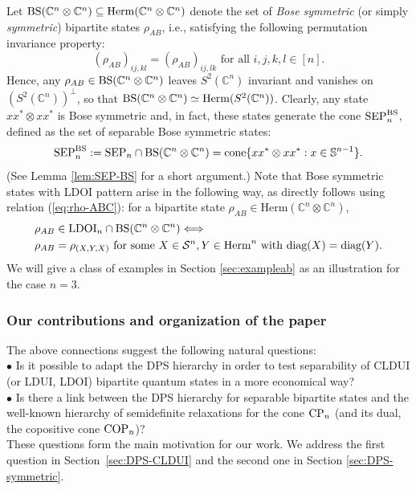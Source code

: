 \documentclass[11pt]{article}
\newcommand{\R}{\ensuremath{\mathbb{R}}}   %
\newcommand{\C}{\ensuremath{\mathbb{C}}} %
\newcommand{\MS}{{\mathcal S}}
\newcommand{\Herm}{\mathrm{Herm}}
\newcommand{\Cnn}{\C^n\ot \C^n}
\newcommand{\sS}{\mathbb S}
\newcommand{\SEP}{\text{\rm SEP}}
\newcommand{\CP}{\text{\rm CP}}
\newcommand{\COP}{\text{\rm COP}}
\newcommand{\LDUI}{\text{\rm LDUI}}
\newcommand{\LDOI}{\text{\rm LDOI}}
\newcommand{\SEPBS}{\SEP^{\BS}}
\newcommand{\cone}{\text{\rm cone}}
\newcommand{\diag}{\text{\rm diag}}
\newcommand{\ot}{\otimes}
\newcommand{\BS}{\text{\rm BS}}
\theoremstyle{plain}
\begin{document}
 Let $\BS(\Cnn)\subseteq\Herm(\Cnn)$ denote the set of {\em Bose symmetric} (or simply {\em symmetric}) bipartite  states $\rho_{AB}$, i.e., satisfying the following permutation invariance property: 
 $$(\rho_{AB})_{ij,kl}=(\rho_{AB})_{ij,lk} \text{  for all } i,j,k,l\in [n].$$
Hence, any $\rho_{AB}\in\BS(\C^n\ot \C^n)$ leaves $S^2(\C^n)$ invariant and vanishes on $(S^2(\C^n))^\perp$, so that $\BS(\C^n\ot \C^n)\simeq\Herm(S^2(\C^n))$. Clearly, any state $xx^*\ot xx^*$ is Bose symmetric and, in fact,  these states  generate  the cone  $\SEPBS_n$, defined as the  set of separable Bose symmetric states:
\begin{align}\label{eq:SEP-BS}
\SEPBS_n:=\SEP_n\cap\BS(\Cnn)=\cone\{xx^*\ot xx^*: x\in \sS^{n-1}\}.
\end{align}
(See Lemma \ref{lem:SEP-BS} for a short argument.)
Note that Bose symmetric states with LDOI pattern arise in the following way, as directly follows using relation (\ref{eq:rho-ABC}): for a 
bipartite state $\rho_{AB}\in\Herm(\C^n\ot \C^n)$,
\begin{align}\label{eq:LDUI-BS}
\begin{split}
&\rho_{AB}\in \LDOI_n \cap \BS(\C^n\ot \C^n)\Longleftrightarrow  \\
&\rho_{AB}=\rho_{(X,Y,X)} \text{ for some } X\in\MS^n, Y\in\Herm^n \text{ with } \diag(X)=\diag(Y).
\end{split}\end{align}
 We will give a class of examples in Section \ref{sec:exampleab} as  an illustration for the case $n=3$.

\subsubsection*{Our contributions and organization of the paper}
 The above connections suggest the following natural questions:\\ %
$\bullet$  Is it possible to adapt the DPS hierarchy in order to test separability of CLDUI (or LDUI, LDOI) bipartite quantum states in a more economical way? \\
$\bullet$  Is there a   link between the DPS hierarchy for separable bipartite states and the well-known hierarchy of semidefinite relaxations for the cone $\CP_n$ (and its dual, the copositive cone $\COP_n$)? \\
 These questions form the main motivation for our work.  We address the first question in Section~\ref{sec:DPS-CLDUI} and the second one in Section \ref{sec:DPS-symmetric}.
\end{document}
